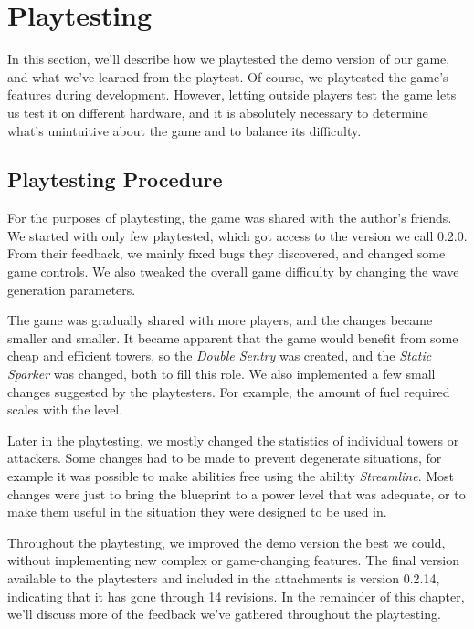\chapter{Playtesting}

In this section, we'll describe how we playtested the demo version of our game, and what we've learned from the playtest.
Of course, we playtested the game's features during development.
However, letting outside players test the game lets us test it on different hardware, and it is absolutely necessary to determine what's unintuitive about the game and to balance its difficulty.

\section{Playtesting Procedure}

For the purposes of playtesting, the game was shared with the author's friends.
We started with only few playtested, which got access to the version we call 0.2.0.
From their feedback, we mainly fixed bugs they discovered, and changed some game controls.
We also tweaked the overall game difficulty by changing the wave generation parameters.

The game was gradually shared with more players, and the changes became smaller and smaller.
It became apparent that the game would benefit from some cheap and efficient towers, so the \emph{Double Sentry} was created, and the \emph{Static Sparker} was changed, both to fill this role.
We also implemented a few small changes suggested by the playtesters.
For example, the amount of fuel required scales with the level.

Later in the playtesting, we mostly changed the statistics of individual towers or attackers.
Some changes had to be made to prevent degenerate situations, for example it was possible to make abilities free using the ability \emph{Streamline}.
Most changes were just to bring the blueprint to a power level that was adequate, or to make them useful in the situation they were designed to be used in.

Throughout the playtesting, we improved the demo version the best we could, without implementing new complex or game-changing features.
The final version available to the playtesters and included in the attachments is version 0.2.14, indicating that it has gone through 14 revisions.
In the remainder of this chapter, we'll discuss more of the feedback we've gathered throughout the playtesting.

